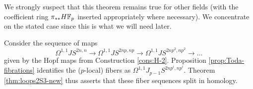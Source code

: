 \documentclass{amsart}
\numberwithin{proposition}{section}
\numberwithin{equation}{section}
\begin{document}
\begin{remark}
We strongly suspect that this theorem remains true for other fields (with the coefficient ring $\pi_{**} H\mathbb{F}_p$ inserted appropriately where necessary).
We concentrate on the stated case since this is what we will need later.
\end{remark}

\begin{remark}
Consider the sequence of maps \[ \Omega^{1,1} JS^{2n,n} \to \Omega^{1,1} JS^{2np,np} \to \Omega^{1,1} JS^{2np^2,np^2} \to \dots \] given by the Hopf maps from Construction \ref{cons:H-2}.
Proposition \ref{prop:Toda-fibrations} identifies the ($p$-local) fibers as $\Omega^{1,1}J_{p-1}S^{2np^i,np^i}$.
Theorem \ref{thm:loops2S3-new} thus asserts that these fiber sequences split in homology.
\end{remark}
\end{document}
